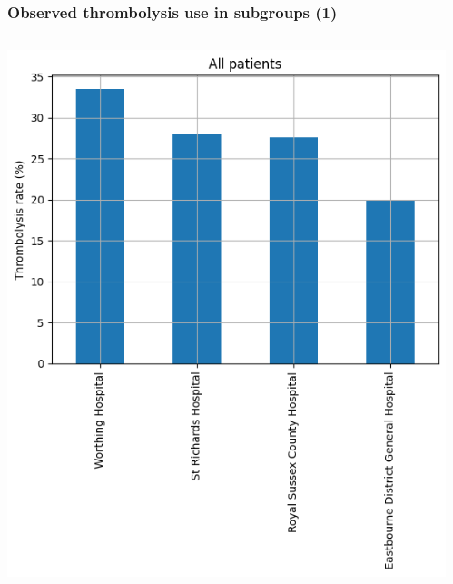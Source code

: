\begin{frame}
\frametitle{Observed thrombolysis use in subgroups (1)}

  \begin{columns}[T]
    \begin{column}{0.5\textwidth}
      \includegraphics[width=1.0\textwidth]{./sussex/images/subgroup_all}
    \end{column}
    \begin{column}{0.5\textwidth}

\end{column}
\end{columns}
\end{frame}
